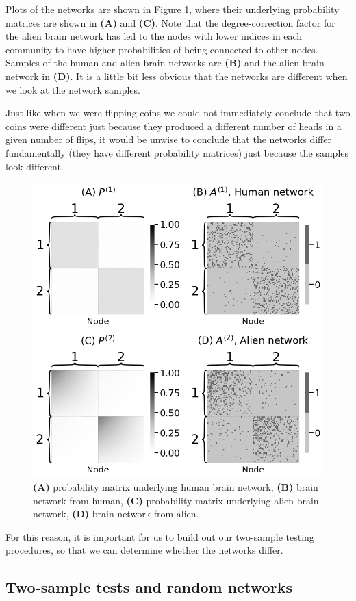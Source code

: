 Plots of the networks are shown in Figure \ref{fig:ch8:twosample:ex}, where their underlying probability matrices are shown in \textbf{(A)} and \textbf{(C)}. Note that the degree-correction factor for the alien brain network has led to the nodes with lower indices in each community to have higher probabilities of being connected to other nodes. Samples of the human and alien brain networks are \textbf{(B)} and the alien brain network in \textbf{(D)}. It is a little bit less obvious that the networks are different when we look at the network samples. 

Just like when we were flipping coins we could not immediately conclude that two coins were different just because they produced a different number of heads in a given number of flips, it would be unwise to conclude that the networks differ fundamentally (they have different probability matrices) just because the samples look different. 

\begin{figure}[h]
    \centering
    \includegraphics[width=0.7\linewidth]{applications/ch8/Images/ts_ex.png}
    \caption[Human and alien brains]{\textbf{(A)} probability matrix underlying human brain network, \textbf{(B)} brain network from human, \textbf{(C)} probability matrix underlying alien brain network, \textbf{(D)} brain network from alien.}
    \label{fig:ch8:twosample:ex}
\end{figure}

For this reason, it is important for us to build out our two-sample testing procedures, so that we can determine whether the networks differ.

\subsection{Two-sample tests and random networks}

